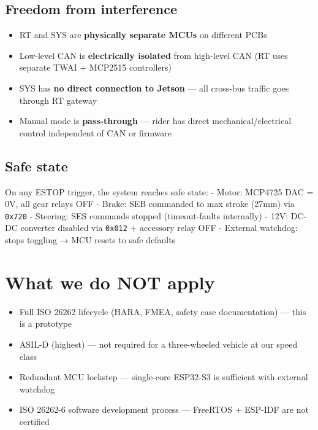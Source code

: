 \documentclass[12pt,a4paper,oneside]{report}
\providecommand{\tightlist}{\setlength{\itemsep}{0pt}\setlength{\parskip}{0pt}}
\begin{document}
\subsection{Freedom from interference}\label{freedom-from-interference}

\begin{itemize}
\tightlist
\item
  RT and SYS are \textbf{physically separate MCUs} on different PCBs
\item
  Low-level CAN is \textbf{electrically isolated} from high-level CAN (RT uses
  separate TWAI + MCP2515 controllers)
\item
  SYS has \textbf{no direct connection to Jetson} --- all cross-bus traffic goes
  through RT gateway
\item
  Manual mode is \textbf{pass-through} --- rider has direct
  mechanical/electrical control independent of CAN or firmware
\end{itemize}

\subsection{Safe state}\label{safe-state}

On any ESTOP trigger, the system reaches safe state: - Motor: MCP4725 DAC = 0V,
all gear relays OFF - Brake: SEB commanded to max stroke (27mm) via
\texttt{0x720} - Steering: SES commands stopped (timeout-faults internally) -
12V: DC-DC converter disabled via \texttt{0x012} + accessory relay OFF -
External watchdog: stops toggling → MCU resets to safe defaults

\section{What we do NOT apply}\label{what-we-do-not-apply}

\begin{itemize}
\tightlist
\item
  Full ISO 26262 lifecycle (HARA, FMEA, safety case documentation) --- this is a
  prototype
\item
  ASIL-D (highest) --- not required for a three-wheeled vehicle at our speed
  class
\item
  Redundant MCU lockstep --- single-core ESP32-S3 is sufficient with external
  watchdog
\item
  ISO 26262-6 software development process --- FreeRTOS + ESP-IDF are not
  certified
\end{itemize}
\end{document}
